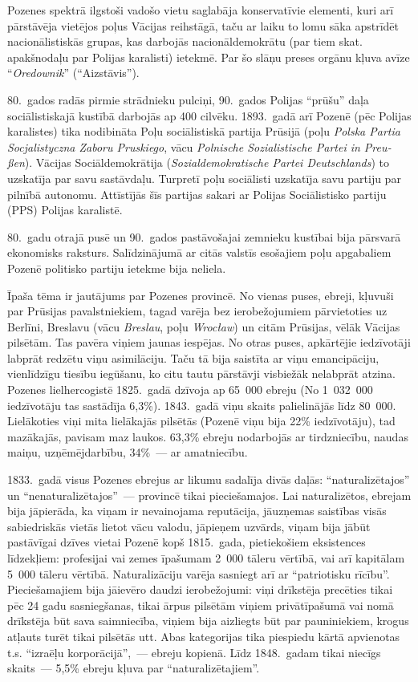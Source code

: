 \documentclass[twoside,a5paper,12pt,fleqn,openany]{extbook}
\newcommand{\pltxti}[1]{\textit{\textpolish{#1}}}
\newcommand{\detxti}[1]{\textit{\textgerman{#1}}}
\begin{document}
Pozenes  spektrā ilgstoši vadošo vietu saglabāja konservatīvie elementi, kuri arī pārstāvēja vietējos poļus Vācijas reihstāgā, taču ar laiku to lomu sāka apstrīdēt nacionālistiskās grupas, kas darbojās nacionāldemokrātu (par tiem skat. apakšnodaļu par Polijas karalisti) ietekmē. Par šo slāņu preses orgānu kļuva avīze ``\pltxti{Oredownik}'' (``Aizstāvis'').

80.~gados radās pirmie strādnieku pulciņi, 90.~gados Polijas ``prūšu'' daļa sociālistiskajā kustībā darbojās ap 400 cilvēku. 1893.~gadā arī Pozenē (pēc Polijas karalistes) tika nodibināta Poļu sociālistiskā partija Prūsijā (poļu \pltxti{Polska Partia Socjalistyczna Zaboru Pruskiego}, vācu \detxti{Polnische Sozialistische Partei in Preußen}). Vācijas Sociāldemokrātija (\detxti{Sozialdemokratische Partei Deutschlands}) to uzskatīja par savu sastāvdaļu. Turpretī poļu sociālisti uzskatīja savu partiju par pilnībā autonomu. Attīstījās šīs partijas sakari ar Polijas Sociālistisko partiju (PPS) Polijas karalistē.

80.~gadu otrajā pusē un 90.~gados pastāvošajai zemnieku kustībai bija pārsvarā ekonomisks raksturs. Salīdzinājumā ar citās valstīs esošajiem poļu apgabaliem Pozenē politisko partiju ietekme bija neliela.

Īpaša tēma ir jautājums par  Pozenes provincē. No vienas puses, ebreji, kļuvuši par Prūsijas pavalstniekiem, tagad varēja bez ierobežojumiem pārvietoties uz Berlīni, Breslavu (vācu \detxti{Breslau}, poļu \pltxti{Wrocław}) un citām Prūsijas, vēlāk Vācijas pilsētām. Tas pavēra viņiem jaunas iespējas. No otras puses, apkārtējie iedzīvotāji labprāt redzētu viņu asimilāciju. Taču tā bija saistīta ar viņu emancipāciju, vienlīdzīgu tiesību iegūšanu, ko citu tautu pārstāvji visbiežāk nelabprāt atzina. Pozenes lielhercogistē 1825.~gadā dzīvoja ap 65~000 ebreju (No 1~032~000 iedzīvotāju tas sastādīja 6,3\%). 1843.~gadā viņu skaits palielinājās līdz 80~000. Lielākoties viņi mita lielākajās pilsētās (Pozenē viņu bija 22\% iedzīvotāju), tad mazākajās, pavisam maz laukos. 63,3\% ebreju nodarbojās ar tirdzniecību, naudas maiņu, uzņēmējdarbību, 34\%~--- ar amatniecību.

1833.~gadā visus Pozenes ebrejus ar likumu sadalīja divās daļās: ``naturalizētajos'' un ``nenaturalizētajos''~--- provincē tikai pieciešamajos. Lai naturalizētos, ebrejam bija jāpierāda, ka viņam ir nevainojama reputācija, jāuzņemas saistības visās sabiedriskās vietās lietot vācu valodu, jāpieņem uzvārds, viņam bija jābūt pastāvīgai dzīves vietai Pozenē kopš 1815.~gada, pietiekošiem eksistences līdzekļiem: profesijai vai zemes īpašumam 2~000 tāleru vērtībā, vai arī kapitālam 5~000 tāleru vērtībā. Naturalizāciju varēja sasniegt arī ar ``patriotisku rīcību''. Pieciešamajiem bija jāievēro daudzi ierobežojumi: viņi drīkstēja precēties tikai pēc 24 gadu sasniegšanas, tikai ārpus pilsētām viņiem privātīpašumā vai nomā drīkstēja būt sava saimniecība, viņiem bija aizliegts būt par pauniniekiem, krogus atļauts turēt tikai pilsētās utt. Abas kategorijas tika piespiedu kārtā apvienotas t.s. ``izraēļu korporācijā'',~--- ebreju kopienā. Līdz 1848.~gadam tikai niecīgs skaits~--- 5,5\% ebreju kļuva par ``naturalizētajiem''.
\end{document}
